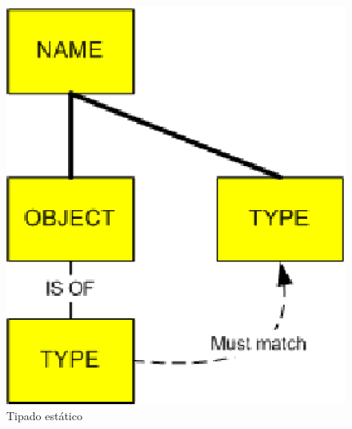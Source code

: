 \documentclass[12pt,legalpaper]{report}
\begin{document}
\begin{figure}[hpb]
	\centering
	\includegraphics[scale=0.5]{images/JavaPython/staticTyping.eps}
	\caption{Tipado estático}
\end{figure}
\end{document}
